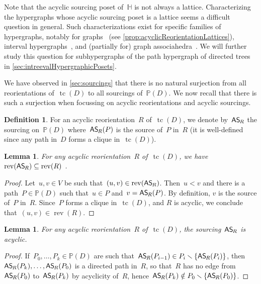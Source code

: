 \documentclass{amsart}
\newtheorem{lemma}[theorem]{Lemma}
\theoremstyle{definition}
\newtheorem{definition}[theorem]{Definition}
\newcommand{\ssm}{\smallsetminus} %
\DeclareMathOperator{\tc}{tc} %
\newcommand{\mymap}[2]{\mathsf{#1}_{\hspace{-.7pt}#2}}
\DeclareMathOperator{\rev}{rev} %
\newcommand{\asour}[1]{\mymap{AS}{#1}}  %
\newcommand{\HH}{\mathbb H}  %
\newcommand{\PP}{\mathbb P} %
\begin{document}
Note that the acyclic sourcing poset of~$\HH$ is not always a lattice.
Characterizing the hypergraphs whose acyclic sourcing poset is a lattice seems a difficult question in general.
Such characterizations exist for specific families of hypergraphs, notably for graphs~\cite{Pilaud-acyclicReorientationLattices} (see \cref{prop:acyclicReorientationLattices}), interval hypergraphs~\cite{BergeronPilaud}, and (partially for) graph associahedra~\cite{BarnardMcConville}.
We will further study this question for subhypergraphs of the path hypergraph of directed trees in \cref{sec:intreevalHypergraphicPosets}.

We have observed in \cref{sec:sourcings} that there is no natural surjection from all reorientations of~$\tc(D)$ to all sourcings of~$\PP(D)$.
We now recall that there is such a surjection when focussing on acyclic reorientations and acyclic sourcings.

\begin{definition}
For an acyclic reorientation~$R$ of~$\tc(D)$, we denote by~$\asour{R}$ the sourcing on~$\PP(D)$ where~$\asour{R}(P)$ is the source of~$P$ in~$R$ (it is well-defined since any path in~$D$ forms a clique in~$\tc(D)$).
\end{definition}

\begin{lemma}
\label{lem:rev}
For any acyclic reorientation~$R$ of~$\tc(D)$, we have~$\rev(\asour{R}) \subseteq \rev(R)$ .
\end{lemma}

\begin{proof}
Let~$u,v \in V$ be such that~$(u,v) \in \rev(\asour{R})$. 
Then~$u < v$ and there is a path~$P \in \PP(D)$ such that~$u \in P$ and~$v = \asour{R}(P)$.
By definition, $v$ is the source of~$P$ in~$R$.
Since~$P$ forms a clique in~$\tc(D)$, and $R$ is acyclic, we conclude that~$(u,v) \in \rev(R)$.
\end{proof}

\begin{lemma}
\label{lem:AReori2ASour1}
For any acyclic reorientation~$R$ of~$\tc(D)$, the sourcing~$\asour{R}$ is acyclic.
\end{lemma}

\begin{proof}
If~$P_0, \dots, P_k \in \PP(D)$ are such that~$\asour{R}(P_{i-1}) \in P_i \ssm \{\asour{R}(P_i)\}$, then~$\asour{R}(P_k), \dots, \asour{R}(P_0)$ is a directed path in~$R$, so that~$R$ has no edge from~$\asour{R}(P_0)$ to~$\asour{R}(P_k)$ by acyclicity of~$R$, hence~${\asour{R}(P_k) \notin P_0 \ssm \{\asour{R}(P_0)\}}$.
\end{proof}
\end{document}
